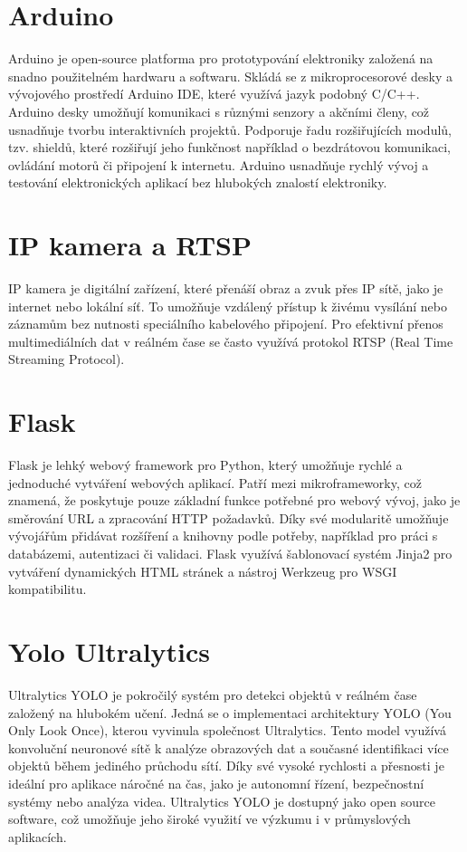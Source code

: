 \section{Arduino}\label{sec:arduino}
Arduino je open-source platforma pro prototypování elektroniky založená na snadno použitelném hardwaru a softwaru.
Skládá se z mikroprocesorové desky a vývojového prostředí Arduino IDE, které využívá jazyk podobný C/C++.
Arduino desky umožňují komunikaci s různými senzory a akčními členy, což usnadňuje tvorbu interaktivních projektů.
Podporuje řadu rozšiřujících modulů, tzv. shieldů, které rozšiřují jeho funkčnost například o bezdrátovou komunikaci, ovládání motorů či připojení k internetu.
Arduino usnadňuje rychlý vývoj a testování elektronických aplikací bez hlubokých znalostí elektroniky.

\section{IP kamera a RTSP}\label{sec:ipcamera-rtsp}
IP kamera je digitální zařízení, které přenáší obraz a zvuk přes IP sítě, jako je internet nebo lokální síť.
To umožňuje vzdálený přístup k živému vysílání nebo záznamům bez nutnosti speciálního kabelového připojení.
Pro efektivní přenos multimediálních dat v reálném čase se často využívá protokol RTSP (Real Time Streaming Protocol).

\section{Flask}\label{sec:flask}
Flask je lehký webový framework pro Python, který umožňuje rychlé a jednoduché vytváření webových aplikací.
Patří mezi mikroframeworky, což znamená, že poskytuje pouze základní funkce potřebné pro webový vývoj, jako je směrování URL a zpracování HTTP požadavků.
Díky své modularitě umožňuje vývojářům přidávat rozšíření a knihovny podle potřeby, například pro práci s databázemi, autentizaci či validaci.
Flask využívá šablonovací systém Jinja2 pro vytváření dynamických HTML stránek a nástroj Werkzeug pro WSGI kompatibilitu.

\section{Yolo Ultralytics}\label{sec:yolo-ultralytics}
Ultralytics YOLO je pokročilý systém pro detekci objektů v reálném čase založený na hlubokém učení. Jedná se o implementaci architektury YOLO (You Only Look Once), kterou vyvinula společnost Ultralytics. Tento model využívá konvoluční neuronové sítě k analýze obrazových dat a současné identifikaci více objektů během jediného průchodu sítí. Díky své vysoké rychlosti a přesnosti je ideální pro aplikace náročné na čas, jako je autonomní řízení, bezpečnostní systémy nebo analýza videa. Ultralytics YOLO je dostupný jako open source software, což umožňuje jeho široké využití ve výzkumu i v průmyslových aplikacích.

